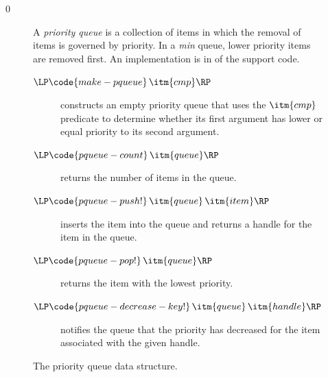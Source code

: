 \documentclass[7x10]{TimesAPriori_MIT}%
\def\racketEd{0}
\def\edition{1}
\numberwithin{theorem}{chapter}
\numberwithin{definition}{chapter}
\numberwithin{equation}{chapter}
\begin{document}
{\if\edition\racketEd      
\begin{figure}[tp]
  \small
  \begin{tcolorbox}[title=Priority Queue]
    A \emph{priority queue}
    is a collection of items in which the
    removal of items is governed by priority. In a \emph{min} queue,
    lower priority items are removed first. An implementation is in
     of the support code.
  \begin{description}
  \item[$\LP\code{make-pqueue}\,\itm{cmp}\RP$] constructs an empty
    priority queue that uses the $\itm{cmp}$ predicate to determine
    whether its first argument has lower or equal priority to its
    second argument.
  \item[$\LP\code{pqueue-count}\,\itm{queue}\RP$] returns the number of
    items in the queue.
  \item[$\LP\code{pqueue-push!}\,\itm{queue}\,\itm{item}\RP$] inserts
    the item into the queue and returns a handle for the item in the
    queue.
  \item[$\LP\code{pqueue-pop!}\,\itm{queue}\RP$] returns the item with
    the lowest priority.
  \item[$\LP\code{pqueue-decrease-key!}\,\itm{queue}\,\itm{handle}\RP$]
    notifies the queue that the priority has decreased for the item
    associated with the given handle.
  \end{description}
\end{tcolorbox}
  \caption{The priority queue data structure.}
  \label{fig:priority-queue}
\end{figure}
\fi}
\end{document}
